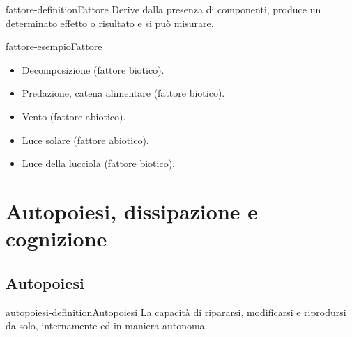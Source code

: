 \documentclass[preview]{standalone}
\begin{document}
\begin{snippetdefinition}{fattore-definition}{Fattore}
    Derive dalla presenza di componenti, produce un determinato effetto o risultato e si può misurare.
\end{snippetdefinition}

\begin{snippetexample}{fattore-esempio}{Fattore}
    \begin{itemize}
        \item Decomposizione (fattore biotico).
        \item Predazione, catena alimentare (fattore biotico).
        \item Vento (fattore abiotico).
        \item Luce solare (fattore abiotico).
        \item Luce della lucciola (fattore biotico).
    \end{itemize}
\end{snippetexample}


\section{Autopoiesi, dissipazione e cognizione}


\subsection{Autopoiesi}

\begin{snippetdefinition}{autopoiesi-definition}{Autopoiesi}
    La capacità di ripararsi, modificarsi e riprodursi da solo, internamente ed in maniera autonoma.
\end{snippetdefinition}





\end{document}
